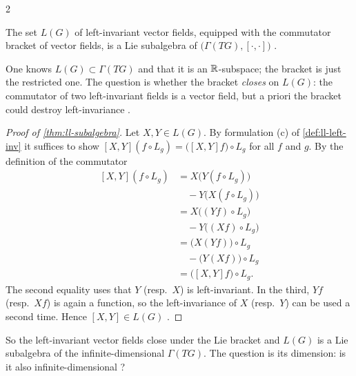\begin{paracol}{2}
\begin{theorem}\label{thm:ll-subalgebra}
The set $L(G)$ of left-invariant vector fields, equipped with the commutator bracket of vector fields, is a Lie subalgebra of $\bigl(\Gamma(TG),[\cdot,\cdot]\bigr)$   .
\end{theorem}
One knows $L(G)\subset\Gamma(TG)$ and that it is an $\mathbb{R}$-subspace; the bracket is just the restricted one. The question is whether the bracket \emph{closes} on $L(G)$: the commutator of two left-invariant fields is a vector field, but a priori the bracket could destroy left-invariance .
\begin{proof}[Proof of \cref{thm:ll-subalgebra}]
Let $X,Y\in L(G)$. By formulation (c) of \cref{def:ll-left-inv} it suffices to show $[X,Y](f\circ L_g)=\bigl([X,Y]f\bigr)\circ L_g$ for all $f$ and $g$. By the definition of the commutator
\[
  \begin{aligned}
  [X,Y](f\circ L_g)&=X\bigl(Y(f\circ L_g)\bigr)\\
  &\quad-Y\bigl(X(f\circ L_g)\bigr)\\
  &=X\bigl((Yf)\circ L_g\bigr)\\
  &\quad-Y\bigl((Xf)\circ L_g\bigr)\\
  &=\bigl(X(Yf)\bigr)\circ L_g\\
  &\quad-\bigl(Y(Xf)\bigr)\circ L_g\\
  &=\bigl([X,Y]f\bigr)\circ L_g.
  \end{aligned}
\]
The second equality uses that $Y$ (resp.\ $X$) is left-invariant. In the third, $Yf$ (resp.\ $Xf$) is again a function, so the left-invariance of $X$ (resp.\ $Y$) can be used a second time. Hence $[X,Y]\in L(G)$        .
\end{proof}
So the left-invariant vector fields close under the Lie bracket and $L(G)$ is a Lie subalgebra of the infinite-dimensional $\Gamma(TG)$. The question is its dimension: is it also infinite-dimensional  ?


\end{paracol}
